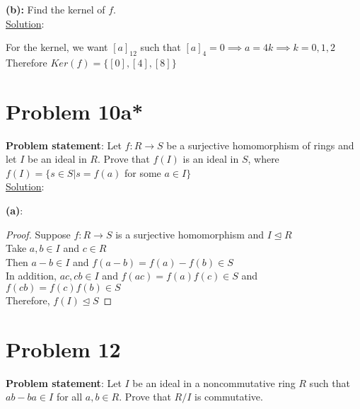 \documentclass{article} %
\begin{document}
\textbf{(b):} Find the kernel of $f$.
\\
\underline{Solution}: 
\begin{addmargin}[1em]{0em}
For the kernel, we want $[a]_{12}$ such that $[a]_4 = 0 \implies a = 4k \implies k = 0, 1, 2$
\\Therefore $Ker(f) = \{[0], [4], [8]\}$
\end{addmargin}    

\newpage

\section*{Problem 10a*}

\textbf{Problem statement}: Let $f: R \rightarrow S$ be a surjective homomorphism of rings and let $I$ be an ideal in $R$.  Prove that $f(I)$ is an ideal in $S$, where $f(I) = \{s \in S|s = f(a)$ for some $a \in I\}$
\\


\underline{Solution}: 
\begin{addmargin}[1em]{0em}
\textbf{(a)}:
\begin{addmargin}[1em]{0em}
\begin{proof}
Suppose $f: R \rightarrow S$ is a surjective homomorphism and $I \unlhd R$
\\Take $a, b \in I$ and $c \in R$
\\Then $a-b \in I$ and $f(a - b) = f(a) - f(b) \in S$
\\In addition, $ac, cb \in I$ and $f(ac) = f(a)f(c) \in S$ and $f(cb) = f(c)f(b) \in S$
\\Therefore, $f(I) \unlhd S$
\end{proof}
\end{addmargin}
\end{addmargin}

\newpage

\section*{Problem 12}


\textbf{Problem statement}: Let $I$ be an ideal in a noncommutative ring $R$ such that $ab - ba \in I$ for all $a, b \in R$.  Prove that $R/I$ is commutative.
\\
\end{document}
